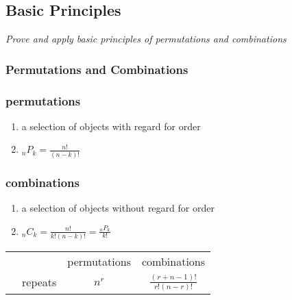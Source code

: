 \subsection[Basic Principles]{Basic Principles}


\textit{Prove and apply basic principles of permutations and combinations}

\subsubsection*{Permutations and Combinations}


\subsubsection[permutations]{permutations}

\begin{enumerate}
    \item a selection of objects with regard for order
    \item $_nP_k = \frac{n!}{(n-k)!}$
\end{enumerate}

\subsubsection[combinations]{combinations}

\begin{enumerate}
    \item a selection of objects without regard for order
    \item $_nC_k = \frac{n!}{k!(n-k)!} = \frac{_nP_k}{k!}$
\end{enumerate}


\vspace{.5cm}

\begin{tabular}{c c c c}
    & & permutations & combinations \\
    &repeats& $n^r$ & $\frac{(r + n - 1)!}{r!(n-r)!}$ \\
\end{tabular}